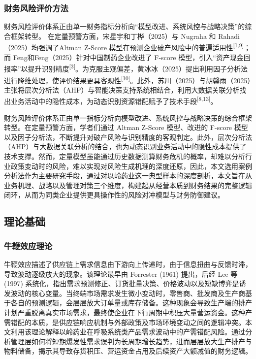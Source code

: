 \documentclass[12pt,a4paper,fontset=windows,UTF8]{ctexart}
\begin{document}
\subsubsection{财务风险评价方法}
财务风险评价体系正由单一财务指标分析向“模型改进、系统风控与战略决策”的综合框架转型。 在定量预警方面，宋星宇和丁桦（2025）与 Nugraha 和 Rahadi（2025）均强调了Altman Z-Score 模型在预测企业破产风险中的普遍适用性\textsuperscript{[1,9]}；而 Feng和Feng（2025）针对中国制药企业改进了 F-score 模型，引入“资产现金回报率”以提升识别精度\textsuperscript{[3]}。为克服主观偏差，黄冰冰（2025）提出利用因子分析法进行降维处理，使评价结果更具客观性\textsuperscript{[10]}。此外，苏川（2025）与胡馨雨（2025）主张将层次分析法（AHP）与智能决策支持系统相结合，利用大数据关联分析找出业务活动中的隐性成本，为动态识别资源错配赋予了技术手段\textsuperscript{[8,13]}。

财务风险评价体系正由单一指标分析向模型改进、系统风控与战略决策的综合框架转型。在定量预警方面，学者们通过 Altman Z-Score 模型、改进的 F-score 模型以及因子分析法，不断提升对破产风险与识别精度的客观判定。此外，层次分析法（AHP）与大数据关联分析的结合，也为动态识别业务活动中的隐性成本提供了技术支撑。然而，定量模型虽能通过历史数据测算财务危机的概率，却难以分析行业政策变动时的风险，难以实现对风险生成机理的深度还原，因此，本文选用案例分析法作为主要研究手段，通过对以岭药业这一典型样本的深度剖析，本文旨在从业务机理、战略以及管理对策三个维度，构建起从经营本质到财务结果的完整逻辑闭环，从而为同类企业提供更具操作性的风险对冲模型与财务防御建议。

\subsection{理论基础}
\subsubsection{牛鞭效应理论}
牛鞭效应描述了供应链上需求信息由下游向上传递时，由于信息扭曲与反馈时滞，导致波动逐级放大的现象。该理论最早由 Forrester (1961) 提出，后经 Lee 等 (1997) 系统化，指出需求预测修正、订货批量决策、价格波动以及短缺博弈是诱发波动的核心变量。当终端市场需求发生微小变动时，零售商、批发商及生产商基于各自的预测逻辑，会层层放大订单量或库存储备。这种现象会导致生产端的排产计划严重脱离真实市场需求，最终使企业在下行周期中积压大量营运资金。这种产需错配的本质，是供应链响应机制与外部政策及市场环境变动之间的逻辑冲突。本文利用该理论解释以岭药业在呼吸系统类产品需求波动中的产需错配风险。通过分析管理层如何将短期爆发性需求误判为长周期增长趋势，进而层层放大生产排产与物料储备，揭示其导致存货积压、营运资金占用及后续资产大额减值的财务逻辑。
\end{document}

